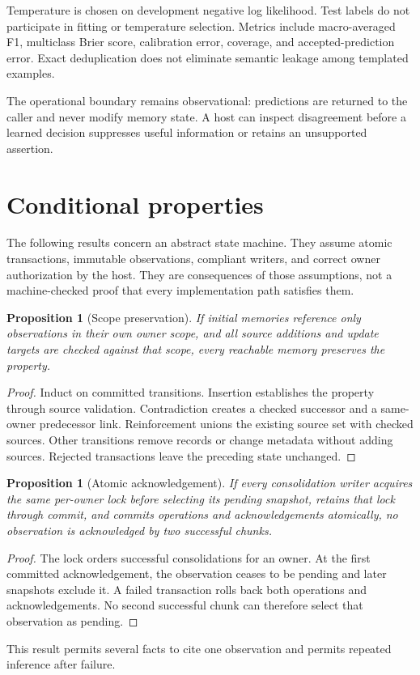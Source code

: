 \documentclass[11pt]{article}
\newtheorem{proposition}[theorem]{Proposition}
\begin{document}
Temperature is chosen on development negative log likelihood. Test labels do not participate in fitting or temperature selection. Metrics include macro-averaged F1, multiclass Brier score, calibration error, coverage, and accepted-prediction error. Exact deduplication does not eliminate semantic leakage among templated examples.

The operational boundary remains observational: predictions are returned to the caller and never modify memory state. A host can inspect disagreement before a learned decision suppresses useful information or retains an unsupported assertion.

\section{Conditional properties}
The following results concern an abstract state machine. They assume atomic transactions, immutable observations, compliant writers, and correct owner authorization by the host. They are consequences of those assumptions, not a machine-checked proof that every implementation path satisfies them.

\begin{proposition}[Scope preservation]
If initial memories reference only observations in their own owner scope, and all source additions and update targets are checked against that scope, every reachable memory preserves the property.
\end{proposition}
\begin{proof}
Induct on committed transitions. Insertion establishes the property through source validation. Contradiction creates a checked successor and a same-owner predecessor link. Reinforcement unions the existing source set with checked sources. Other transitions remove records or change metadata without adding sources. Rejected transactions leave the preceding state unchanged.
\end{proof}

\begin{proposition}[Atomic acknowledgement]
If every consolidation writer acquires the same per-owner lock before selecting its pending snapshot, retains that lock through commit, and commits operations and acknowledgements atomically, no observation is acknowledged by two successful chunks.
\end{proposition}
\begin{proof}
The lock orders successful consolidations for an owner. At the first committed acknowledgement, the observation ceases to be pending and later snapshots exclude it. A failed transaction rolls back both operations and acknowledgements. No second successful chunk can therefore select that observation as pending.
\end{proof}
This result permits several facts to cite one observation and permits repeated inference after failure.
\end{document}
